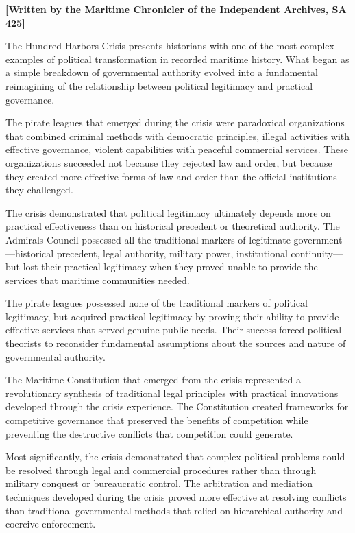 \textbf{{[}Written by the Maritime Chronicler of the Independent
Archives, SA 425{]}}

The Hundred Harbors Crisis presents historians with one of the most
complex examples of political transformation in recorded maritime
history. What began as a simple breakdown of governmental authority
evolved into a fundamental reimagining of the relationship between
political legitimacy and practical governance.

The pirate leagues that emerged during the crisis were paradoxical
organizations that combined criminal methods with democratic principles,
illegal activities with effective governance, violent capabilities with
peaceful commercial services. These organizations succeeded not because
they rejected law and order, but because they created more effective
forms of law and order than the official institutions they challenged.

The crisis demonstrated that political legitimacy ultimately depends
more on practical effectiveness than on historical precedent or
theoretical authority. The Admiral\textquotesingle s Council possessed
all the traditional markers of legitimate government---historical
precedent, legal authority, military power, institutional
continuity---but lost their practical legitimacy when they proved unable
to provide the services that maritime communities needed.

The pirate leagues possessed none of the traditional markers of
political legitimacy, but acquired practical legitimacy by proving their
ability to provide effective services that served genuine public needs.
Their success forced political theorists to reconsider fundamental
assumptions about the sources and nature of governmental authority.

The Maritime Constitution that emerged from the crisis represented a
revolutionary synthesis of traditional legal principles with practical
innovations developed through the crisis experience. The Constitution
created frameworks for competitive governance that preserved the
benefits of competition while preventing the destructive conflicts that
competition could generate.

Most significantly, the crisis demonstrated that complex political
problems could be resolved through legal and commercial procedures
rather than through military conquest or bureaucratic control. The
arbitration and mediation techniques developed during the crisis proved
more effective at resolving conflicts than traditional governmental
methods that relied on hierarchical authority and coercive enforcement.

